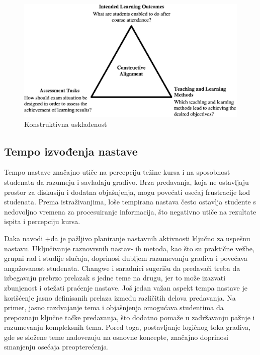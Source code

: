 \documentclass[a4paper]{article}
\begin{document}
\begin{figure}[h!]
\begin{center}
\includegraphics[scale=2]{constructive_alignment.jpeg}
\end{center}
\caption{Konstruktivna usklađenost}
\label{fig:konstruktivna_uskladjenost}
\end{figure}

\subsection{Tempo izvođenja nastave}
Tempo nastave značajno utiče na percepciju težine kursa i na sposobnost studenata da
razumeju i savladaju gradivo. Brza predavanja, koja ne ostavljaju prostor za diskusiju i
dodatna objašnjenja, mogu povećati osećaj frustracije kod studenata. Prema istraživanjima,
loše tempirana nastava često ostavlja studente s nedovoljno vremena za procesuiranje
informacija, što negativno utiče na rezultate ispita i percepciju kursa.

Daka \cite{daka2020exploration} navodi +da je pažljivo planiranje nastavnih aktivnosti ključno za uspešnu
nastavu. Uključivanje raznovrsnih nastav-
ih metoda, kao što su praktične vežbe, grupni rad i
studije slučaja, doprinosi dubljem razumevanju gradiva i povećava angažovanost studenata.
Changwe i saradnici \cite{daka2020exploration} sugerišu da predavači treba da izbegavaju prebrzo prelazak s
jedne teme na drugu, jer to može izazvati zbunjenost i otežati praćenje nastave.
Još jedan važan aspekt tempa nastave je korišćenje jasno definisanih prelaza između
različitih delova predavanja. Na primer, jasno razdvajanje tema i objašnjenja omogućava
studentima da prepoznaju ključne tačke predavanja, što dodatno pomaže u zadržavanju
pažnje i razumevanju kompleksnih tema. Pored toga, postavljanje logičnog toka gradiva, gde
se složene teme nadovezuju na osnovne koncepte, značajno doprinosi smanjenju osećaja
preopterećenja.
\end{document}
